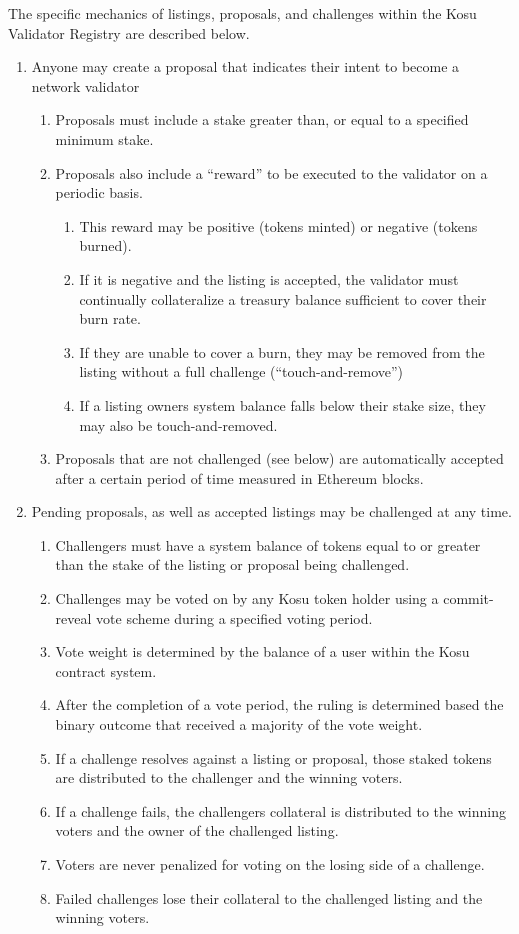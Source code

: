 \documentclass[10pt]{article}
\begin{document}
The specific mechanics of listings, proposals, and challenges within the Kosu Validator Registry are described below. 
\medskip

\begin{enumerate}
  \item Anyone may create a proposal that indicates their intent to become a network validator
  \begin{enumerate}
    \item Proposals must include a stake greater than, or equal to a specified minimum stake.
    \item Proposals also include a “reward” to be executed to the validator on a periodic basis.
    \begin{enumerate}
      \item This reward may be positive (tokens minted) or negative (tokens burned).
      \item If it is negative and the listing is accepted, the validator must continually collateralize a treasury balance sufficient to cover their burn rate.
      \item If they are unable to cover a burn, they may be removed from the listing without a full challenge (“touch-and-remove”)
      \item If a listing owners system balance falls below their stake size, they may also be touch-and-removed. 
    \end{enumerate}
    \item Proposals that are not challenged (see below) are automatically accepted after a certain period of time measured in Ethereum blocks.
  \end{enumerate}
  \item Pending proposals, as well as accepted listings may be challenged at any time.
  \begin{enumerate}
    \item Challengers must have a system balance of tokens equal to or greater than the stake of the listing or proposal being challenged. 
    \item Challenges may be voted on by any Kosu token holder using a commit-reveal vote scheme during a specified voting period.
    \item Vote weight is determined by the balance of a user within the Kosu contract system.
    \item After the completion of a vote period, the ruling is determined based the binary outcome that received a majority of the vote weight.
    \item If a challenge resolves against a listing or proposal, those staked tokens are distributed to the challenger and the winning voters.
    \item If a challenge fails, the challengers collateral is distributed to the winning voters and the owner of the challenged listing. 
    \item Voters are never penalized for voting on the losing side of a challenge.
    \item Failed challenges lose their collateral to the challenged listing and the winning voters.
  \end{enumerate}
\end{enumerate}
\end{document}
